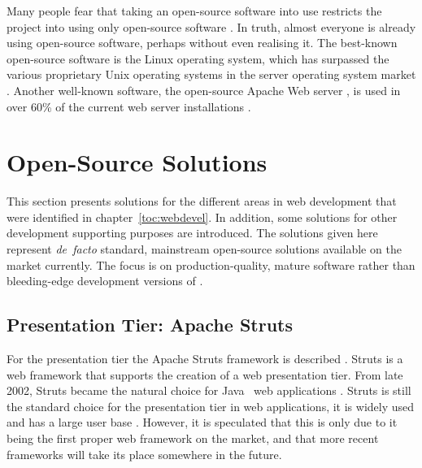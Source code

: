 Many people fear that taking an open-source software into use 
restricts the project into using only open-source software 
\citep{ossolutions}. In truth, almost everyone is already using 
open-source software, perhaps without even realising it. The 
best-known open-source software is the Linux operating system, which 
has surpassed the various proprietary Unix operating systems in the 
server operating system market \citep{exploratoryos}. Another 
well-known  software, the open-source Apache Web server 
\citep{apache}, is used in over 60\% of the current web server 
installations \citep{websurvey}.


\section{Open-Source Solutions}
\label{toc:oss:selected}

This section presents solutions for the different areas in web 
development that were identified in chapter~\ref{toc:webdevel}. In 
addition, some  solutions for other development supporting 
purposes are introduced. The solutions given here represent 
\textit{de~facto} standard, mainstream open-source solutions available 
on the market currently. The focus is on production-quality, mature 
software rather than bleeding-edge development versions of 
.


\subsection{Presentation Tier: Apache Struts}
\label{toc:oss:selected:struts}

For the presentation tier the Apache Struts framework is described 
\citep{struts}. Struts is a web framework that supports the creation 
of a web presentation tier. From late 2002, Struts became the natural 
choice for Java~ web applications \citep{j2eeframeworks}. 
Struts is still the standard choice for the presentation tier in web 
applications, it is widely used and has a large user base 
\citep{advancedwebdevel}. However, it is speculated that this is only 
due to it being the first proper web framework on the market, and that 
more recent frameworks will take its place somewhere in the future.

